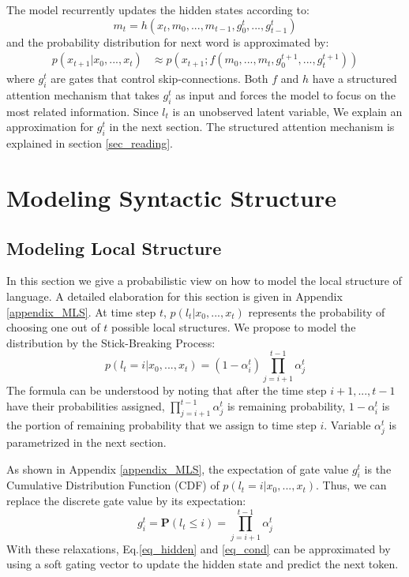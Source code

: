 \documentclass{article} \usepackage{iclr2018_conference,times}
\begin{document}
The model recurrently updates the hidden states according to:
\begin{equation}
m_{t} = h(x_t, m_{0},...,m_{t-1},g_0^t,...,g_{t-1}^t) \label{eq_hidden}
\end{equation}
and the probability distribution for next word is approximated by:
\begin{align}
p(x_{t+1}|x_0,...,x_{t}) &\approx p(x_{t+1};f(m_{0},...,m_t,g_0^{t+1},...,g_{t}^{t+1})) \label{eq_cond}
\end{align}
where ${g_i^t}$ are gates that control skip-connections. Both $f$ and $h$ have a structured attention mechanism that takes $g_i^t$ as input and forces the model to focus on the most related information. Since $l_t$ is an unobserved latent variable, We explain an approximation for ${g_i^t}$ in the next section. The structured attention mechanism is explained in section \ref{sec_reading}.











\section{Modeling Syntactic Structure}
\subsection{Modeling Local Structure} \label{MLS}
In this section we give a probabilistic view on how to model the local structure of language. A detailed elaboration for this section is given in Appendix \ref{appendix_MLS}.
At time step $t$, $p(l_{t}|x_0, ...,x_t)$ represents the probability of choosing one out of $t$ possible local structures. We propose to model the distribution by the Stick-Breaking Process:
\begin{equation}
p(l_{t}=i|x_0, ...,x_t) = (1-\alpha_{i}^{t})\prod_{j=i+1}^{t-1}\alpha_j^{t} 
\label{eq_SB}
\end{equation}
The formula can be understood by noting that after the time step $i+1,...,t-1$ have their probabilities assigned, $\prod_{j=i+1}^{t-1}\alpha_j^{t}$ is remaining probability, $1-\alpha_{i}^{t}$ is the portion of remaining probability that we assign to time step $i$. Variable $\alpha_j^{t}$ is parametrized in the next section.


As shown in Appendix \ref{appendix_MLS}, the expectation of gate value $g_i^{t}$ is the Cumulative Distribution Function (CDF) of $p(l_{t}=i|x_0, ...,x_t)$. Thus, we can replace the discrete gate value by its expectation:
\begin{equation} \label{gate_equal_multialpha}
g_{i}^{t} = \mathbf{P}(l_{t}\leq i) = \prod_{j=i+1}^{t-1}\alpha_j^{t}
\end{equation}
With these relaxations, Eq.\ref{eq_hidden} and \ref{eq_cond} can be approximated by using a soft gating vector to update the hidden state and predict the next token. 
\end{document}
